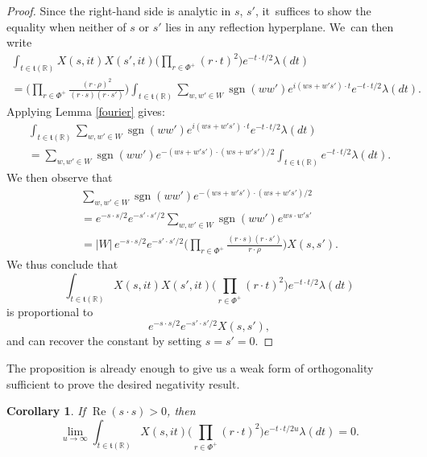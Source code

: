 \documentclass[JEP,XML,SOM,Unicode,NoFloatCountersInSection,published]{cedram}
\newtheorem{cor}[equation]{Corollary}
\theoremstyle{definition}
\newcommand{\mft}{\mathfrak{t}}
\newcommand{\R}{\mathbb{R}}
\DeclareMathOperator{\RE}{Re}
\DeclareMathOperator{\sgn}{sgn}
\begin{document}
\begin{proof}
Since the right-hand side is analytic in $s$, $s'$, it~suffices to show
the equality when neither of $s$ or $s'$ lies in any reflection
hyperplane. We~can then write
\begin{multline*}
\int_{t\in \mft(\R)} X(s,it)X(s',it)
\biggl( \prod_{r\in \Phi^+} (r\cdot t)^2\biggr)
e^{-t\cdot t/2}
\lambda(dt)
\\
=\biggl(\prod_{r\in \Phi^+} \frac{(r\cdot \rho)^2}{(r\cdot s)(r\cdot s')}\biggr)
\int_{t\in \mft(\R)}
\sum_{w,w'\in W}
\sgn(ww')
e^{i(ws+w's')\cdot t}
e^{-t\cdot t/2}
\lambda(dt).
\end{multline*}
Applying Lemma \ref{fourier} gives:
\begin{multline*}
\int_{t\in \mft(\R)}
\sum_{w,w'\in W}
\sgn(ww')
e^{i(ws+w's')\cdot t}
e^{-t\cdot t/2}
\lambda(dt)\\[-5pt]
=\sum_{w,w'\in W}
\sgn(ww')
e^{-(ws+w's')\cdot(ws+w's')/2}
\int_{t\in \mft(\R)}
e^{-t\cdot t/2}
\lambda(dt).
\end{multline*}
We then observe that
\begin{multline*}
\sum_{w,w'\in W}
\sgn(ww')
e^{-(ws+w's')\cdot (ws+w's')/2}
\\[-5pt]
= e^{-s\cdot s/2}e^{-s'\cdot s'/2}
\sum_{w,w'\in W} \sgn(ww') e^{ws\cdot w's'}
\\
= |W| \,
e^{-s\cdot s/2} e^{-s'\cdot s'/2}
\biggl( \prod_{r\in \Phi^+}\frac{(r\cdot s)(r\cdot s')}{r\cdot \rho} \biggr)
X(s,s').
\end{multline*}
We thus conclude that
\[
\int_{t\in \mft(\R)} X(s,it)X(s',it)
\biggl( \prod_{r\in \Phi^+} (r\cdot t)^2 \biggr)
e^{-t\cdot t/2}
\lambda(dt)
\]
is proportional to
\[
e^{-s\cdot s/2}e^{-s'\cdot s'/2}
X(s,s'),
\]
and can recover the constant by setting $s=s'=0$.
\end{proof}

The proposition is already enough to give us a weak form of orthogonality sufficient
to prove the desired negativity result.

\begin{cor} \label{limit.0}
If $\RE(s\cdot s)>0$, then
\[
\lim_{u\to\infty}
\int_{t\in \mft(\R)} X(s,it)
\biggl( \prod_{r\in \Phi^+} (r\cdot t)^2 \biggr)
e^{-t\cdot t/2u}
\lambda(dt)
=
0.
\]
\end{cor}
\end{document}
